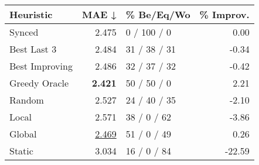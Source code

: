 \begin{tabular}{lrlr}
\toprule
\textbf{Heuristic} & \textbf{MAE ↓} & \textbf{\% Be/Eq/Wo} & \textbf{\% Improv.} \\
\midrule
            Synced &          2.475 &          0 / 100 / 0 &                0.00 \\
\midrule
       Best Last 3 &          2.484 &         31 / 38 / 31 &               -0.34 \\
    Best Improving &          2.486 &         32 / 37 / 32 &               -0.42 \\
\addlinespace
     Greedy Oracle &          \textbf{2.421} &          50 / 50 / 0 &                2.21 \\
            Random &          2.527 &         24 / 40 / 35 &               -2.10 \\
\midrule
             Local &          2.571 &          38 / 0 / 62 &               -3.86 \\
            Global &          \underline{2.469} &          51 / 0 / 49 &                0.26 \\
\midrule
            Static &          3.034 &          16 / 0 / 84 &              -22.59 \\
\bottomrule
\end{tabular}

\label{tab:hr_iid_lr05_le2_bs4_Summary}
